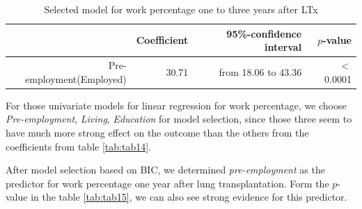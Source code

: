 \documentclass[11pt, a4paper]{article}\usepackage[]{graphicx}\usepackage[]{color}
\begin{document}
{%
\begin{table}[!h]
\centering
\caption{Selected model for work percentage
                one to three years after LTx} 
\begingroup\footnotesize
\begin{tabular}{rrrr}
  \hline
 & Coefficient & 95\%-confidence interval & $p$-value \\ 
  \hline
Pre-employment(Employed) & 30.71 & from 18.06 to 43.36 & $<$ 0.0001 \\ 
   \hline
\end{tabular}
\endgroup
\end{table}


For those univariate models for linear regression for work percentage, we choose \textit{Pre-employment}, \textit{Living}, \textit{Education} for model selection, since those three seem to have much more strong effect on the outcome than the others from the coefficients from table \ref{tab:tab14}.

After model selection based on BIC, we determined \textit{pre-employment} as the predictor for work percentage one year after lung transplantation. Form the $p$-value in the table \ref{tab:tab15}, we can also see strong evidence for this predictor.

\clearpage
}
\end{document}
